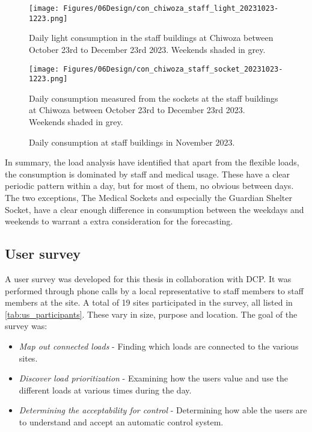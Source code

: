 \begin{figure}
  \centering
  \begin{minipage}{0.7\textwidth} %
    \centering
    \texttt{[image: Figures/06Design/con\_chiwoza\_staff\_light\_20231023-1223.png]}
    \caption[Staff Light consumption Chiwoza 20231023-1223]{Daily light consumption in the staff buildings at Chiwoza between October 23rd to December 23rd 2023. Weekends shaded in grey.}
    \label{fig:con_chiwoza_staff_light_20231023-1223}
  \end{minipage}

  \vspace{0.5cm} %

  \begin{minipage}{0.7\textwidth} %
    \centering
    \texttt{[image: Figures/06Design/con\_chiwoza\_staff\_socket\_20231023-1223.png]}
    \caption[Staff Socket consumption Chiwoza 20231023-1223]{Daily consumption measured from the sockets at the staff buildings at Chiwoza between October 23rd to December 23rd 2023. Weekends shaded in grey.}
    \label{fig:con_chiwoza_staff_socket_20231023-1223}
  \end{minipage}

  \caption[Staff consumption Chiwoza 20231023-1223]{Daily consumption at staff buildings in November 2023.}
  \label{fig:con_chiwoza_staff_20231023-1223}
\end{figure}

In summary, the load analysis have identified that apart from the flexible loads, the consumption is dominated by staff and medical usage. These have a clear periodic pattern within a day, but for most of them, no obvious between days. The two exceptions, The Medical Sockets and especially the Guardian Shelter Socket, have a clear enough difference in consumption between the weekdays and weekends to warrant a extra consideration for the forecasting.


\subsection{User survey}\label{seq:user_survey}
A user survey was developed for this thesis in collaboration with DCP. It was performed through phone calls by a local representative to staff members to staff members at the site. A total of 19 sites participated in the survey, all listed in \ref{tab:us_participants}. These vary in size, purpose and location. The goal of the survey was:
\begin{itemize}
    \item \textit{Map out connected loads}  - Finding which loads are connected to the various sites.
    \item \textit{Discover load prioritization} - Examining how the users value and use the different loads at various times during the day.
    \item \textit{Determining the acceptability for control}    - Determining how able the users are to understand and accept an automatic control system. 
\end{itemize}

